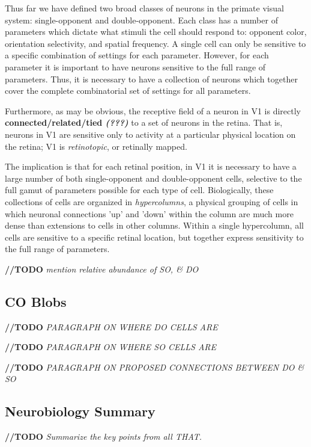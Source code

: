 \documentclass[journal,onecolumn]{IEEEtran}
\begin{document}
Thus far we have defined two broad classes of neurons in the primate visual system: single-opponent and double-opponent. Each class has a number of parameters which dictate what stimuli the cell should respond to: opponent color, orientation selectivity, and spatial frequency. A single cell can only be sensitive to a specific combination of settings for each parameter. However, for each parameter it is important to have neurons sensitive to the full range of parameters. Thus, it is necessary to have a collection of neurons which together cover the complete combinatorial set of settings for all parameters.

Furthermore, as may be obvious, the receptive field of a neuron in V1 is directly \textbf{connected/related/tied \textit{(???)}} to a set of neurons in the retina. That is, neurons in V1 are sensitive only to activity at a particular physical location on the retina; V1 is \textit{retinotopic}, or retinally mapped.

The implication is that for each retinal position, in V1 it is necessary to have a large number of both single-opponent and double-opponent cells, selective to the full gamut of parameters possible for each type of cell. Biologically, these collections of cells are organized in \textit{hypercolumns}, a physical grouping of cells in which neuronal connections 'up' and 'down' within the column are much more dense than extensions to cells in other columns. Within a single hypercolumn, all cells are sensitive to a specific retinal location, but together express sensitivity to the full range of parameters.

\textbf{//TODO} \textit{mention relative abundance of SO, \& DO}


\subsection*{CO Blobs}

\textbf{//TODO} \textit{PARAGRAPH ON WHERE DO CELLS ARE}

\textbf{//TODO} \textit{PARAGRAPH ON WHERE SO CELLS ARE}

\textbf{//TODO} \textit{PARAGRAPH ON PROPOSED CONNECTIONS BETWEEN DO \& SO}


\subsection*{Neurobiology Summary}

\textbf{//TODO} \textit{Summarize the key points from all THAT.}
\end{document}
